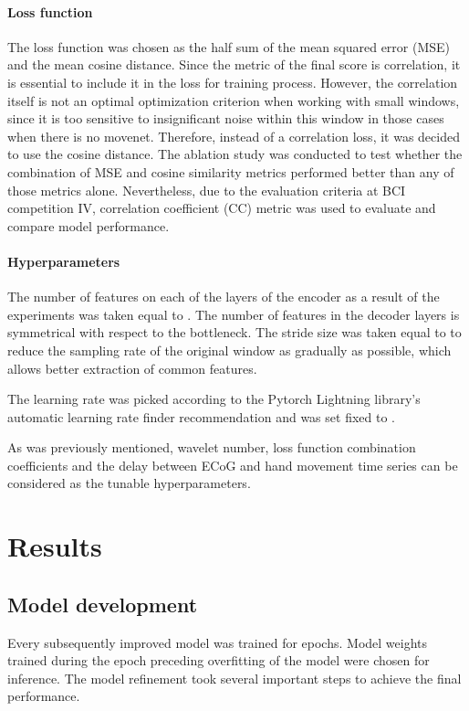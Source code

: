 \documentclass[letterpaper]{article} \usepackage{aaai22}  \usepackage{times}  \usepackage{helvet}  \usepackage{courier}  \usepackage[hyphens]{url}  \usepackage{graphicx} \urlstyle{rm} \def\UrlFont{\rm}  \usepackage{natbib}  \usepackage{caption} \DeclareCaptionStyle{ruled}{labelfont=normalfont,labelsep=colon,strut=off} \frenchspacing  \setlength{\pdfpagewidth}{8.5in}  \setlength{\pdfpageheight}{11in}  \usepackage{algorithm}
\begin{document}
\paragraph{Loss function}

The loss function was chosen as the half sum of the mean squared error (MSE) and the mean cosine distance. Since the metric of the final score is correlation, it is essential to include it in the loss for training process. However, the correlation itself is not an optimal optimization criterion when working with small windows, since it is too sensitive to insignificant noise within this window in those cases when there is no movenet. Therefore, instead of a correlation loss, it was decided to use the cosine distance. The ablation study was conducted to test whether the combination of MSE and cosine similarity metrics performed better than any of those metrics alone. 
Nevertheless, due to the evaluation criteria at BCI competition IV, correlation coefficient (CC) metric was used to evaluate and compare model performance.

\paragraph{Hyperparameters}

The number of features on each of the layers of the encoder as a result of the experiments was taken equal to . The number of features in the decoder layers is symmetrical with respect to the bottleneck. The stride size was taken equal to  to reduce the sampling rate of the original window as gradually as possible, which allows better extraction of common features.

The learning rate was picked according to the Pytorch Lightning library's automatic learning rate finder recommendation and was set fixed to .

As was previously mentioned, wavelet number, loss function combination coefficients and the delay between ECoG and hand movement time series can be considered as the tunable hyperparameters.


\section{Results}


\subsection{Model development}
Every subsequently improved model was trained for  epochs. Model weights trained during the epoch preceding overfitting of the model were chosen for inference. The model refinement took several important steps to achieve the final performance.
\end{document}
